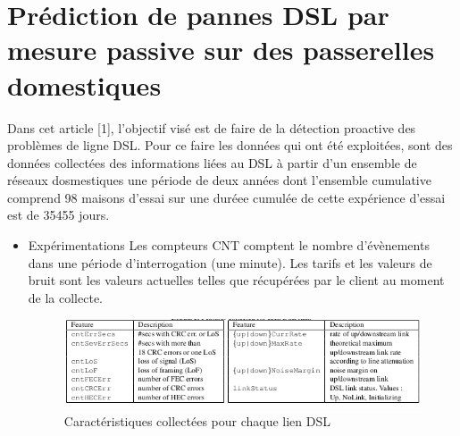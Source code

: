 \section{Prédiction de pannes DSL par mesure passive sur des passerelles domestiques}
Dans cet article [1], l'objectif visé est de faire de la détection proactive des problèmes de ligne DSL. Pour ce faire les données qui ont été exploitées, sont des données collectées des informations liées au DSL à partir d'un ensemble de réseaux dosmestiques une période de deux années dont l'ensemble cumulative comprend 98 maisons d'essai sur une duréee cumulée de cette expérience d'essai est de 35455 jours. 

\begin{itemize}[label=\textbullet, font=\LARGE \color{black}]
\item Expérimentations
\newline
Les compteurs CNT comptent le nombre d'évènements dans une période d'interrogation (une minute). Les tarifs et les valeurs de bruit sont les valeurs actuelles telles que récupérées par le client au moment de la collecte.
\begin{figure}[h]
\begin{center}
\includegraphics[scale=0.70]{Features.png}
\caption[Caractéristiques collectées pour chaque lien DSL]{Caractéristiques collectées pour chaque lien DSL}
\label{monlabel}
\end{center}
\end{figure}


\end{itemize}
